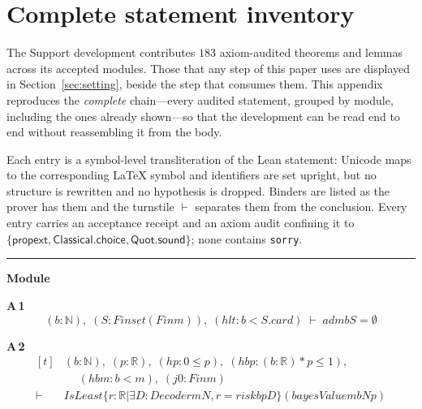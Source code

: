 \appendices
\section{Complete statement inventory}
\label{app:inventory}

The Support development contributes $183$ axiom-audited theorems and lemmas across its accepted modules. Those that any step of this paper uses are displayed in Section~\ref{sec:setting}, beside the step that consumes them. This appendix reproduces the \emph{complete} chain---every audited statement, grouped by module, including the ones already shown---so that the development can be read end to end without reassembling it from the body.

Each entry is a symbol-level transliteration of the Lean statement: Unicode maps to the corresponding \LaTeX{} symbol and identifiers are set upright, but no structure is rewritten and no hypothesis is dropped. Binders are listed as the prover has them and the turnstile $\vdash$ separates them from the conclusion. Every entry carries an acceptance receipt and an axiom audit confining it to $\{\textsf{propext},\textsf{Classical.choice},\textsf{Quot.sound}\}$; none contains \texttt{sorry}.

\vspace{4pt}\noindent\rule{\columnwidth}{0.4pt}\par\vspace{2pt}
\noindent\textbf{Module }\par\vspace{3pt}

\noindent\textbf{A\,1}\quad{}
{\footnotesize\[ (\mathit{b} : \mathbb{N} ),\; (\mathit{S} : \mathit{Finset} (\mathit{Fin} \mathit{m})),\; (\mathit{hlt} : \mathit{b} < \mathit{S}.\mathit{card}) \;\vdash\; \mathit{adm} \mathit{b} \mathit{S} = \emptyset \]}

\noindent\textbf{A\,2}\quad{}
{\footnotesize\[ \begin{aligned}[t]
&(\mathit{b} : \mathbb{N} ),\; (\mathit{p} : \mathbb{R} ),\; (\mathit{hp} : 0 \leq \mathit{p}),\; (\mathit{hbp} : (\mathit{b} : \mathbb{R} ) * \mathit{p} \leq 1),\\
&\quad \; (\mathit{hbm} : \mathit{b} < \mathit{m}),\; (\mathit{j0} : \mathit{Fin} \mathit{m})\\
\vdash\;&\mathit{IsLeast} \{ \mathit{r} : \mathbb{R} | \exists \mathit{D} : \mathit{Decoder} \mathit{m} \mathit{N}, \mathit{r} = \mathit{risk} \mathit{b} \mathit{p} \mathit{D}\} (\mathit{bayesValue} \mathit{m} \mathit{b} \mathit{N} \mathit{p})
\end{aligned} \]}

